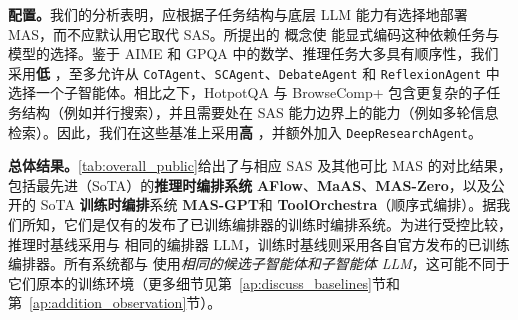 \textbf{配置。}我们的分析表明，应根据子任务结构与底层 LLM 能力有选择地部署 MAS，而不应默认用它取代 SAS。所提出的 \textbf{\masness} 概念使 \ourframework 能显式编码这种依赖任务与模型的选择。鉴于 AIME 和 GPQA 中的数学、推理任务大多具有顺序性，我们采用\textbf{低 \masness}，至多允许从 \texttt{CoTAgent}、\texttt{SCAgent}、\texttt{DebateAgent} 和 \texttt{ReflexionAgent} 中选择一个子智能体。相比之下，HotpotQA 与 BrowseComp+ 包含更复杂的子任务结构（例如并行搜索），并且需要处在 SAS 能力边界上的能力（例如多轮信息检索）。因此，我们在这些基准上采用\textbf{高 \masness}，并额外加入 \texttt{DeepResearchAgent}。

\textbf{总体结果。}\cref{tab:overall_public}给出了与相应 SAS 及其他可比 MAS 的对比结果，包括最先进（SoTA）的\textbf{推理时编排系统} \textbf{AFlow}\citep{zhang2024aflowautomatingagenticworkflow}、\textbf{MaAS}\citep{zhang2025multiagentarchitecturesearchagentic}、\textbf{MAS-Zero}\citep{Ke2025MASZero}，以及公开的 SoTA \textbf{训练时编排}系统 \textbf{MAS-GPT}\citep{ye2025masgpttrainingllmsbuild}和 \textbf{ToolOrchestra}\citep{su2025toolorchestraelevatingintelligenceefficient}（顺序式编排）。据我们所知，它们是仅有的发布了已训练编排器的训练时编排系统。为进行受控比较，推理时基线采用与 \ourframework 相同的编排器 LLM，训练时基线则采用各自官方发布的已训练编排器。所有系统都与 \ourframework 使用\textit{相同的候选子智能体和子智能体 LLM}，这可能不同于它们原本的训练环境（更多细节见第~\ref{ap:discuss_baselines}节和第~\ref{ap:addition_observation}节）。


